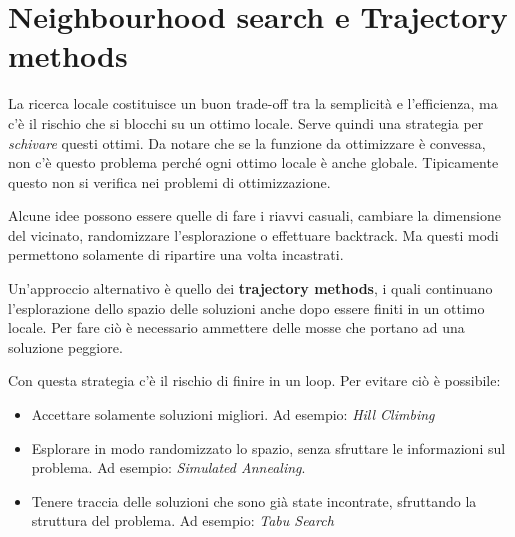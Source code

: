 

\section{Neighbourhood search e Trajectory methods}

La ricerca locale costituisce un buon trade-off tra la semplicità e l'efficienza, ma c'è il rischio che si blocchi su un ottimo locale.
Serve quindi una strategia per \textit{schivare} questi ottimi. Da notare che se la funzione da ottimizzare è convessa, non c'è questo problema perché ogni ottimo locale è anche globale. Tipicamente questo non si verifica nei problemi di ottimizzazione.

Alcune idee possono essere quelle di fare i riavvi casuali, cambiare la dimensione del vicinato, randomizzare l'esplorazione o effettuare backtrack. Ma questi modi permettono solamente di ripartire una volta incastrati.

Un'approccio alternativo è quello dei \textbf{trajectory methods}, i quali continuano l'esplorazione dello spazio delle soluzioni anche dopo essere finiti in un ottimo locale.
Per fare ciò è necessario ammettere delle mosse che portano ad una soluzione peggiore.

Con questa strategia c'è il rischio di finire in un loop. Per evitare ciò è possibile:

\begin{itemize}
	\item Accettare solamente soluzioni migliori. Ad esempio: \textit{Hill Climbing}
	\item Esplorare in modo randomizzato lo spazio, senza sfruttare le informazioni sul problema. Ad esempio: \textit{Simulated Annealing}.
	\item Tenere traccia delle soluzioni che sono già state incontrate, sfruttando la struttura del problema. Ad esempio: \textit{Tabu Search}
\end{itemize}

